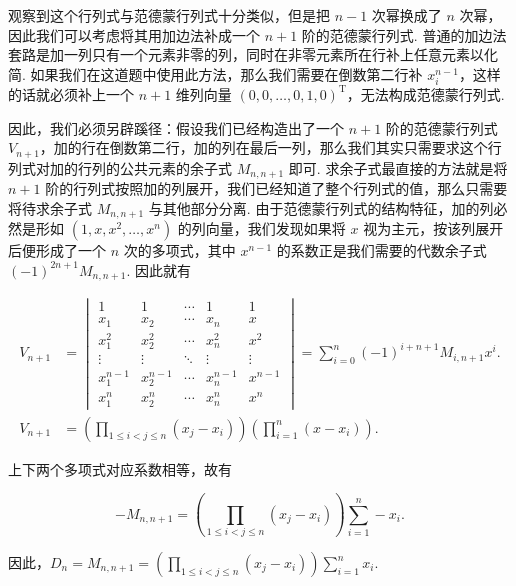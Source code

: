 \documentclass[UTF8,12pt,a4paper,fontset=fandol]{ctexart}
\begin{document}
\begin{solve}
观察到这个行列式与范德蒙行列式十分类似，但是把 $n-1$ 次幂换成了 $n$ 次幂，因此我们可以考虑将其用加边法补成一个 $n+1$ 阶的范德蒙行列式. 普通的加边法套路是加一列只有一个元素非零的列，同时在非零元素所在行补上任意元素以化简. 如果我们在这道题中使用此方法，那么我们需要在倒数第二行补 $x_i^{n-1}$，这样的话就必须补上一个 $n+1$ 维列向量 $(0, 0, \ldots, 0, 1, 0)^{\mathrm{T}}$，无法构成范德蒙行列式.

    

    因此，我们必须另辟蹊径：假设我们已经构造出了一个 $n+1$ 阶的范德蒙行列式 $V_{n+1}$，加的行在倒数第二行，加的列在最后一列，那么我们其实只需要求这个行列式对加的行列的公共元素的余子式 $M_{n,n+1}$ 即可. 求余子式最直接的方法就是将 $n+1$ 阶的行列式按照加的列展开，我们已经知道了整个行列式的值，那么只需要将待求余子式 $M_{n,n+1}$ 与其他部分分离. 由于范德蒙行列式的结构特征，加的列必然是形如 $(1, x, x^2, \ldots, x^n)$ 的列向量，我们发现如果将 $x$ 视为主元，按该列展开后便形成了一个 $n$ 次的多项式，其中 $x^{n-1}$ 的系数正是我们需要的代数余子式 $(-1)^{2n+1} M_{n,n+1}$. 因此就有

    \begin{align*}
        V_{n+1} &= \begin{vmatrix}
            1      & 1      & \cdots & 1      & 1      \\
            x_1    & x_2    & \cdots & x_n    & x      \\
            x_1^2  & x_2^2  & \cdots & x_n^2  & x^2    \\
            \vdots & \vdots & \ddots & \vdots & \vdots \\
            x_1^{n-1} & x_2^{n-1} & \cdots & x_n^{n-1} & x^{n-1} \\
            x_1^n  & x_2^n  & \cdots & x_n^n  & x^n
        \end{vmatrix} = \sum\limits_{i=0}^n (-1)^{i+n+1} M_{i, n+1} x^i. \\
        V_{n+1} &= \left( \prod\limits_{1 \leqslant i < j \leqslant n} (x_j - x_i) \right) \left(\prod\limits_{i=1}^n (x - x_i) \right).
    \end{align*}

    上下两个多项式对应系数相等，故有

    \[
        - M_{n,n+1} = \left( \prod\limits_{1 \leqslant i < j \leqslant n} (x_j - x_i) \right) \sum\limits_{i=1}^n -x_i.
    \]

    因此，$D_n = M_{n, n+1} = \left( \displaystyle\prod_{1 \leqslant i < j \leqslant n} (x_j - x_i) \right) \displaystyle\sum_{i=1}^n x_i$.
\end{solve}
\end{document}
